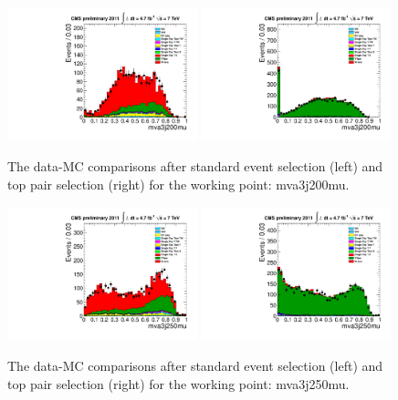 \begin{figure}[!t]
  \centering
  \includegraphics[width=0.49\textwidth]{figs/cl-mva3j200mu-normal.pdf}
  \includegraphics[width=0.49\textwidth]{figs/cl-mva3j200mu-inTTbar.pdf}
  \caption{\label{fig:mva:plots-mva3j200mu} The data-MC comparisons
    after standard event selection (left) and top pair
    selection (right) for the working point: mva3j200mu.}
\end{figure}

\begin{figure}[!t]
  \centering
  \includegraphics[width=0.49\textwidth]{figs/cl-mva3j250mu-normal.pdf}
  \includegraphics[width=0.49\textwidth]{figs/cl-mva3j250mu-inTTbar.pdf}
  \caption{\label{fig:mva:plots-mva3j250mu} The data-MC comparisons
    after standard event selection (left) and top pair
    selection (right) for the working point: mva3j250mu.}
\end{figure}

